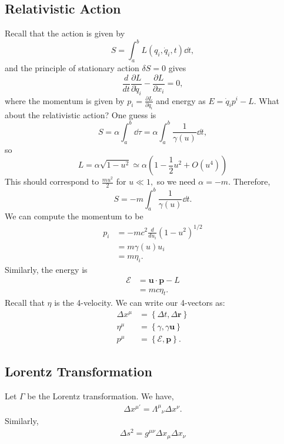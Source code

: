 \documentclass{article}
\numberwithin{equation}{section}
\begin{document}
\subsection{Relativistic Action}
Recall that the action is given by 
\begin{equation}
    S = \int_a^b L(q_i,\dot{q}_i,t)\dd{t},
\end{equation}
and the principle of stationary action $\delta S = 0$ gives 
\begin{equation}
    \frac{d}{dt}\frac{\partial L}{\partial \dot{q}_i} - \frac{\partial L}{\partial x_i} = 0,
\end{equation} 
where the momentum is given by $p_i = \frac{\partial L}{\partial \dot{q}_i}$ and energy as $E=\dot{q}_ip^i - L.$ What about the relativistic action? One guess is 
\begin{equation}
    S = \alpha \int_a^b \dd{\tau} = \alpha\int_a^b \frac{1}{\gamma(u)}\dd{t},
\end{equation}
so
\begin{equation}
    L = \alpha\sqrt{1-u^2} \simeq \alpha\left(1-\frac{1}{2}u^2 + O(u^4)\right)
\end{equation}
This should correspond to $\frac{mu^2}{2}$ for $u \ll 1,$ so we need $\alpha = - m.$ Therefore,
\begin{equation}
    S = -m\int_a^b \frac{1}{\gamma(u)}\dd{t}.
\end{equation}
We can compute the momentum to be 
\begin{align}
    p_i &= -mc^2 \frac{d}{du_i}\left(1 - u^2\right)^{1/2} \\ 
    &= m\gamma(u) u_i \\ 
    &= m\eta_i.
\end{align}
Similarly, the energy is 
\begin{align}
    \mathcal{E} &= \bm{u} \cdot \bm{p} - L \\ 
    &=mc\eta_t.
\end{align}
Recall that $\eta$ is the 4-velocity. We can write our 4-vectors as:
\begin{align}
    \Delta x^\mu &= \left\{\Delta t, \Delta \bm{r}\right\} \\ 
    \eta^\mu &= \left\{\gamma, \gamma\bm{u}\right\} \\ 
    p^\mu &= \left\{\mathcal{E}, \bm{p}\right\}.
\end{align}
\subsection{Lorentz Transformation}
Let $\Gamma$ be the Lorentz transformation. We have,
\begin{align*}
    \Delta x^{\mu'} = \Lambda^{\mu}{}_{\nu}\Delta x^{\nu}.
\end{align*}
Similarly,
\begin{align}
    \Delta s^2 = g^{\mu\nu}\Delta x_{\mu}\Delta x_{\nu}
\end{align}
\end{document}
